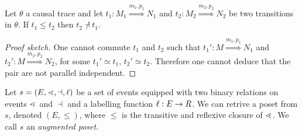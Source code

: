 
\begin{lemma}
  \label{lem:constraint_inhibit}
  Let $\theta$ a causal trace and let $t_1:M_1\overset{m_1,p_1}{\Rightarrow}N_1$ and $t_2:M_2\overset{m_2,p_2}{\Rightarrow}N_2$ be two transitions in $\theta$.
  If $t_1 \leq t_2$ then $t_2\not\dashv t_1$.
\end{lemma}
\begin{proof}[Proof sketch]
  One cannot commute $t_1$ and $t_2$ such that $t_1':M\overset{m_1,p_1}{\Rightarrow}N_1$ and $t_2':M\overset{m_2,p_2}{\Rightarrow}N_2$, for some $t_1'\simeq t_1$, $t_2'\simeq t_2$. Therefore one cannot deduce that the pair are not parallel independent.
\end{proof}

\begin{definition}
  Let $s=(E,\lessdot,\dashv,\ell)$ be a set of events equipped with two binary relations on events $\lessdot$ and $\dashv$ and a labelling function $\ell:E\to R$. We can retrive a poset from $s$, denoted $(E,\leq)$, where $\leq$ is the transitive and reflexive closure of $\lessdot$.
  We call $s$ an \emph{augmented poset}.
\end{definition}

